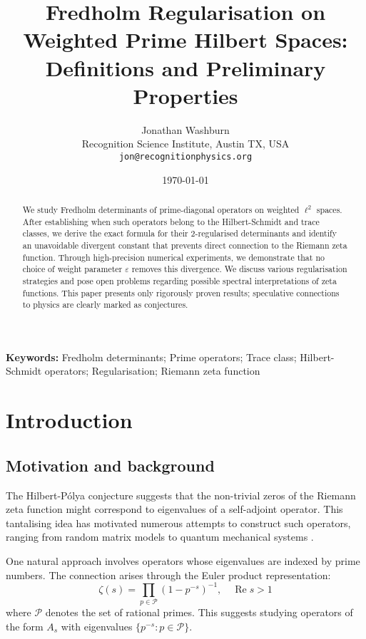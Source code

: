 \documentclass[11pt,a4paper]{article}
\title{\bfseries
Fredholm Regularisation on Weighted Prime Hilbert Spaces:\\[4pt]
Definitions and Preliminary Properties
}
\author{Jonathan Washburn\\
\small Recognition Science Institute, Austin TX, USA\\
\small \texttt{jon@recognitionphysics.org}}
\date{\small \today}
\theoremstyle{definition}
\theoremstyle{remark}
\newcommand{\calP}{\mathcal{P}}
\DeclareMathOperator{\Re}{Re}
\begin{document}
\maketitle

\begin{abstract}
\noindent
We study Fredholm determinants of prime-diagonal operators on weighted $\ell^2$ spaces. 
After establishing when such operators belong to the Hilbert-Schmidt and trace classes, 
we derive the exact formula for their 2-regularised determinants and identify an 
unavoidable divergent constant that prevents direct connection to the Riemann zeta function. 
Through high-precision numerical experiments, we demonstrate that no choice of weight 
parameter $\varepsilon$ removes this divergence. We discuss various regularisation 
strategies and pose open problems regarding possible spectral interpretations of 
zeta functions. This paper presents only rigorously proven results; speculative 
connections to physics are clearly marked as conjectures.
\end{abstract}

\vspace*{0.5em}
\noindent\textbf{Keywords:}\;
Fredholm determinants; Prime operators; Trace class; Hilbert-Schmidt operators; 
Regularisation; Riemann zeta function

\tableofcontents
\bigskip

\section{Introduction}\label{sec:intro}

\subsection{Motivation and background}

The Hilbert-Pólya conjecture suggests that the non-trivial zeros of the Riemann 
zeta function might correspond to eigenvalues of a self-adjoint operator. This 
tantalising idea has motivated numerous attempts to construct such operators, 
ranging from random matrix models \cite{BerryKeating1999} to quantum mechanical 
systems \cite{ConnesTrace1997}.

One natural approach involves operators whose eigenvalues are indexed by prime 
numbers. The connection arises through the Euler product representation:
\[
\zeta(s) = \prod_{p \in \calP} (1 - p^{-s})^{-1}, \quad \Re s > 1
\]
where $\calP$ denotes the set of rational primes. This suggests studying operators 
of the form $A_s$ with eigenvalues $\{p^{-s} : p \in \calP\}$.
\end{document}
